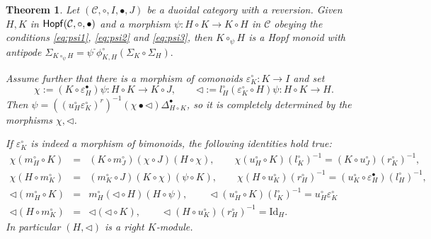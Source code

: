 \documentclass[nosumlimits,twoside]{amsart}
\newtheorem{theorem}{\sc Theorem}[section]
\theoremstyle{definition}
\theoremstyle{remark}
\def\revsn{\text{-}}
\newcommand{\rd}[1]{{\color{red}{#1}}}
\newcommand{\Cc}{\mathcal{C}}
\def\Hopfmon{{\sf Hopf}}
\begin{document}
\begin{theorem}%
\label{thm:psitriang}
Let $(\Cc,\circ,I,\bullet,J)$ be a duoidal category with a reversion.
Given $H,K$ in $\Hopfmon(\Cc,\circ,\bullet)$ and a morphism $\psi :H\circ
K\rightarrow K\circ H$ in $\Cc$ obeying the conditions \eqref{eq:psi1}, \eqref{eq:psi2} and \eqref{eq:psi3}, then $K\circ _{\psi }H$ is a Hopf monoid with antipode $\Sigma
_{K\circ _{\psi }H}=\psi ^{\revsn }\phi _{K,H}^{\circ }\left( \Sigma _{K}\circ
\Sigma _{H}\right) .$

Assume further that there is a morphism of comonoids $%
\varepsilon _{K}^{\circ }:K\rightarrow I$ and set
\[
\chi  :=\left( K\circ \varepsilon _{H}^{\bullet }\right) \psi
:H\circ K\rightarrow K\circ J, \qquad
\triangleleft  :=l_{H}^{\circ }\left( \varepsilon _{K}^{\circ }\circ
H\right) \psi :H\circ K\rightarrow H.
\]
Then $\psi =\left( \left( u_{H}^{\circ }\varepsilon _{K}^{\circ }\right)
^{r}\right) ^{-1}\left( \chi \bullet \triangleleft \right) \Delta
_{H\circ K}^{\bullet }$, so it is completely determined by the morphisms $\chi, \triangleleft$.

If $\varepsilon^\circ_K$ is indeed a morphism of bimonoids, the following identities hold true:
\begin{eqnarray}
\chi \left( m_{H}^{\circ }\circ K\right)  &=&\left( K\circ m_{J}^{\circ
}\right) \left( \chi \circ J\right) \left( H\circ \chi \right) ,\qquad \chi
\left( u_{H}^{\circ }\circ K\right)(l^\circ_K)^{-1} =(K\circ u_{J}^{\circ })(r^\circ_K)^{-1},  \label{eq:chi1}
\\
\chi \left( H\circ m_{K}^{\circ }\right)  &=&\left( m_{K}^{\circ }\circ
J\right) \left( K\circ \chi \right) \left( \psi \circ K\right) ,\qquad \chi
\left( H\circ u_{K}^{\circ }\right) (r^\circ_H)^{-1}=(u_{K}^{\circ }\circ \varepsilon
_{H}^{\bullet })(l^\circ_H)^{-1},  \label{eq:chi2} \\
\triangleleft \left( m_{H}^{\circ }\circ K\right)  &=&m_{H}^{\circ }\left(
\triangleleft \circ H\right) \left( H\circ \psi \right) ,\qquad
\triangleleft \left( u_{H}^{\circ }\circ K\right) (l^\circ_K)^{-1}=u_{H}^{\circ }\varepsilon
_{K}^{\circ }  \label{eq:triangl1} \\
\triangleleft \left( H\circ m_{K}^{\circ }\right)  &=&\triangleleft \left(
\triangleleft \circ K\right) ,\qquad \triangleleft \left( H\circ
u_{K}^{\circ }\right) (r^\circ_H)^{-1}=\mathrm{Id}_{H}.  \label{eq:triangl2}
\end{eqnarray}
In particular $(H,\triangleleft)$ is a right $K$-module.
\end{theorem}
\end{document}
